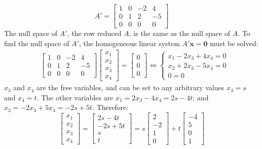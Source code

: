 \documentclass{article}
\begin{document}
\begin{itemize}
\[A' = \begin{bmatrix}
1 & 0 & -2 &  4 \\
0 & 1 &  2 & -5 \\
0 & 0 &  0 &  0 
\end{bmatrix}\]
The null space of \(A'\), the row reduced \(A\), is the same as the null space of \(A\). To find the null space of \(A'\), the homogeneous linear system \(A'\mathbf{x} = \mathbf{0}\) must be solved:
\begin{align*}
& \begin{bmatrix}
1 & 0 & -2 &  4 \\
0 & 1 &  2 & -5 \\
0 & 0 &  0 &  0 
\end{bmatrix}\begin{bmatrix} x_1 \\ x_2 \\ x_3 \\ x_4 \end{bmatrix} = \begin{bmatrix} 0 \\ 0 \\ 0 \end{bmatrix} 
\iff \left\{\begin{array}{c}
x_1 - 2x_3 + 4x_4 = 0 \\ 
x_2 + 2x_3 - 5x_4 = 0 \\ 
0 = 0
\end{array}\right.
\end{align*}
\(x_3\) and \(x_4\) are the free variables, and can be set to any arbitrary values \(x_3 = s\) and \(x_4 = t\). The other variables are \(x_1 = 2x_3 - 4x_4 = 2s - 4t\); and \(x_2 = -2x_3 + 5x_4 = -2s + 5t\). Therefore:
\[\begin{bmatrix} x_1 \\ x_2 \\ x_3 \\ x_4 \end{bmatrix} = \begin{bmatrix} 2s - 4t \\ -2s + 5t \\ s \\ t \end{bmatrix} = s\begin{bmatrix} 2 \\ -2 \\ 1 \\ 0 \end{bmatrix} + t\begin{bmatrix} -4 \\ 5 \\ 0 \\ 1 \end{bmatrix}\]

\end{itemize}
\end{document}
